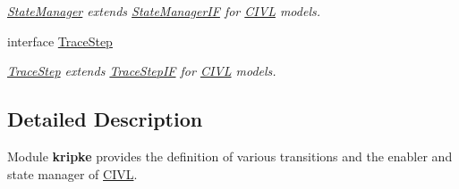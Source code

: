 \begin{DoxyCompactItemize}
\begin{DoxyCompactList}\small\item\em \hyperlink{interfaceedu_1_1udel_1_1cis_1_1vsl_1_1civl_1_1kripke_1_1IF_1_1StateManager}{State\+Manager} extends \hyperlink{}{State\+Manager\+I\+F} for \hyperlink{classedu_1_1udel_1_1cis_1_1vsl_1_1civl_1_1CIVL}{C\+I\+V\+L} models. \end{DoxyCompactList}\item 
interface \hyperlink{interfaceedu_1_1udel_1_1cis_1_1vsl_1_1civl_1_1kripke_1_1IF_1_1TraceStep}{Trace\+Step}
\begin{DoxyCompactList}\small\item\em \hyperlink{interfaceedu_1_1udel_1_1cis_1_1vsl_1_1civl_1_1kripke_1_1IF_1_1TraceStep}{Trace\+Step} extends \hyperlink{}{Trace\+Step\+I\+F} for \hyperlink{classedu_1_1udel_1_1cis_1_1vsl_1_1civl_1_1CIVL}{C\+I\+V\+L} models. \end{DoxyCompactList}\end{DoxyCompactItemize}


\subsection{Detailed Description}
Module {\bfseries kripke} provides the definition of various transitions and the enabler and state manager of \hyperlink{classedu_1_1udel_1_1cis_1_1vsl_1_1civl_1_1CIVL}{C\+I\+V\+L}. 